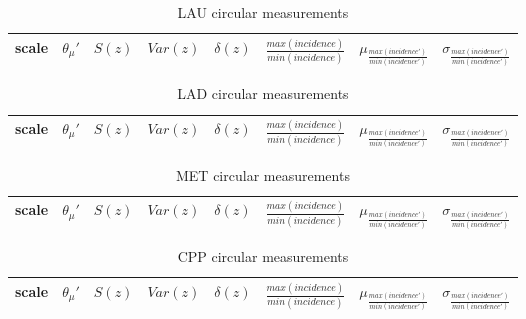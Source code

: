\documentclass[%
	aip,
	jmp,%
	amsmath,amssymb,
	reprint,%
	floatfix,
]{revtex4-1}
\begin{document}
							\begin{table}[!h]
								\caption{LAU circular measurements}
								\begin{center}
									\begin{tabular}{ |l|| c|c|c|c|c||c|c| }
										\hline
										scale & $\theta_\mu'$ & $S(z)$ & $Var(z)$ & $\delta(z)$ & $\frac{max(incidence)}{min(incidence)}$ & $ \mu_{\frac{max(incidence')}{min(incidence')}} $ & $ \sigma_{\frac{max(incidence')}{min(incidence')} } $ \\ \hline\hline
										
									\end{tabular}
								\end{center}
								\label{tab:circLau}
							\end{table}
							\begin{table}[!h]
								\caption{LAD circular measurements}
								\begin{center}
									\begin{tabular}{ |l|| c|c|c|c|c||c|c| }
										\hline
										scale & $\theta_\mu'$ & $S(z)$ & $Var(z)$ & $\delta(z)$ & $\frac{max(incidence)}{min(incidence)}$ & $ \mu_{\frac{max(incidence')}{min(incidence')}} $ & $ \sigma_{\frac{max(incidence')}{min(incidence')} } $ \\ \hline\hline
										
									\end{tabular}
								\end{center}
								\label{tab:circLad}
							\end{table}
							\begin{table}[!h]
								\caption{MET circular measurements}
								\begin{center}
									\begin{tabular}{ |l|| c|c|c|c|c||c|c| }
										\hline
										scale & $\theta_\mu'$ & $S(z)$ & $Var(z)$ & $\delta(z)$ & $\frac{max(incidence)}{min(incidence)}$ & $ \mu_{\frac{max(incidence')}{min(incidence')}} $ & $ \sigma_{\frac{max(incidence')}{min(incidence')} } $ \\ \hline\hline
										
									\end{tabular}
								\end{center}
								\label{tab:circMet}
							\end{table}
							\begin{table}[!h]
								\caption{CPP circular measurements}
								\begin{center}
									\begin{tabular}{ |l|| c|c|c|c|c||c|c| }
										\hline
										scale & $\theta_\mu'$ & $S(z)$ & $Var(z)$ & $\delta(z)$ & $\frac{max(incidence)}{min(incidence)}$ & $ \mu_{\frac{max(incidence')}{min(incidence')}} $ & $ \sigma_{\frac{max(incidence')}{min(incidence')} } $ \\ \hline\hline
										
									\end{tabular}
								\end{center}
								\label{tab:circCPP}
							\end{table}
\end{document}
